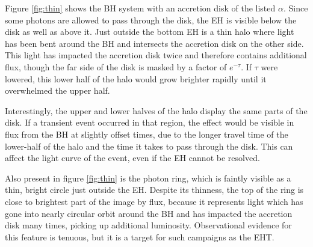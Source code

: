 \documentclass[twocolumn,twocolappendix]{aastex631}
\begin{document}
Figure \ref{fig:thin} shows the BH system with an accretion disk of the listed $\alpha$. Since some photons are allowed to pass through the disk, the EH is visible below the disk as well as above it. Just outside the bottom EH is a thin halo where light has been bent around the BH and intersects the accretion disk on the other side. This light has impacted the accretion disk twice and therefore contains additional flux, though the far side of the disk is masked by a factor of $e^{-\tau}$. If $\tau$ were lowered, this lower half of the halo would grow brighter rapidly until it overwhelmed the upper half.

Interestingly, the upper and lower halves of the halo display the same parts of the disk. If a transient event occurred in that region, the effect would be visible in flux from the BH at slightly offset times, due to the longer travel time of the lower-half of the halo and the time it takes to pass through the disk. This can affect the light curve of the event, even if the EH cannot be resolved.

Also present in figure \ref{fig:thin} is the photon ring, which is faintly visible as a thin, bright circle just outside the EH. Despite its thinness, the top of the ring is close to brightest part of the image by flux, because it represents light which has gone into nearly circular orbit around the BH and has impacted the accretion disk many times, picking up additional luminosity. Observational evidence for this feature is tenuous, but it is a target for such campaigns as the EHT.
\end{document}
